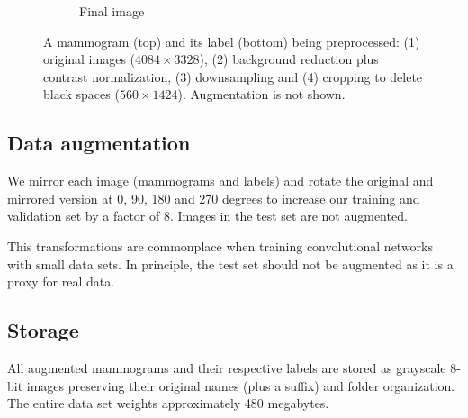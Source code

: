 \begin{figure}[h]
\begin{subfigure}{2.4 cm}
		\caption{Final image}
		\label{subfig:Preprocessingd}
        \end{subfigure}
	\caption[Preprocessing pipeline]{A mammogram (top) and its label (bottom) being preprocessed: (1) original images ($4084 \times 3328$), (2) background reduction plus contrast normalization, (3) downsampling and  (4) cropping to delete black spaces ($560 \times 1424$). Augmentation is not shown.}
	 \label{fig:Preprocessing}
\end{figure}
	
\subsection{Data augmentation}
We mirror each image (mammograms and labels) and rotate the original and mirrored version at 0, 90, 180 and 270 degrees to increase our training and validation set by a factor of 8. 
Images in the test set are not augmented.

This transformations are commonplace when training convolutional networks with small data sets. In principle, the test set should not be augmented as it is a proxy for real data. %


\subsection{Storage}
All augmented mammograms and their respective labels are stored as grayscale 8-bit images preserving their original names (plus a suffix) and folder organization.
The entire data set weights approximately 480 megabytes.
